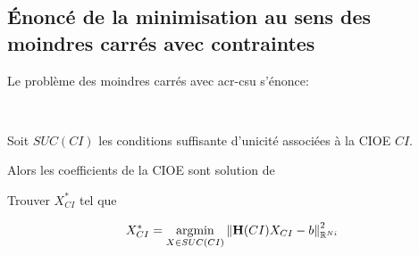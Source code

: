 \subsection{Énoncé de la minimisation au sens des moindres carrés avec contraintes}
  Le problème des moindres carrés avec \gls{acr-csu} s'énonce:

  \begin{prop}
  ~

  Soit \(SUC(CI)\) les conditions suffisante d'unicité associées à la CIOE \(CI\). 

  Alors les coefficients de la CIOE sont solution de 

  Trouver \(X_{CI}^*\) tel que

  \[
    X_{CI}^* = {\underset{X \in SUC(CI)}{\operatorname{argmin}}} \left\lVert {\mathbf{H}}(CI)X_{CI} - {b}\right\rVert^2_{\mathbb R^{Ni}}
  \]
  \end{prop}

  